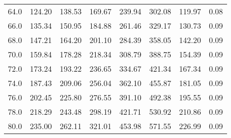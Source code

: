\begin{tabular}{lrrrrrrr}
64.0 &                           124.20 &                           138.53 &                           169.67 &                           239.94 &                             302.08 &                           119.97 &        0.08 \\
66.0 &                           135.34 &                           150.95 &                           184.88 &                           261.46 &                             329.17 &                           130.73 &        0.09 \\
68.0 &                           147.21 &                           164.20 &                           201.10 &                           284.39 &                             358.05 &                           142.20 &        0.09 \\
70.0 &                           159.84 &                           178.28 &                           218.34 &                           308.79 &                             388.75 &                           154.39 &        0.09 \\
72.0 &                           173.24 &                           193.22 &                           236.65 &                           334.67 &                             421.34 &                           167.34 &        0.09 \\
74.0 &                           187.43 &                           209.06 &                           256.04 &                           362.10 &                             455.87 &                           181.05 &        0.09 \\
76.0 &                           202.45 &                           225.80 &                           276.55 &                           391.10 &                             492.38 &                           195.55 &        0.09 \\
78.0 &                           218.29 &                           243.48 &                           298.19 &                           421.71 &                             530.92 &                           210.86 &        0.09 \\
80.0 &                           235.00 &                           262.11 &                           321.01 &                           453.98 &                             571.55 &                           226.99 &        0.09 \\
\bottomrule
\end{tabular}
